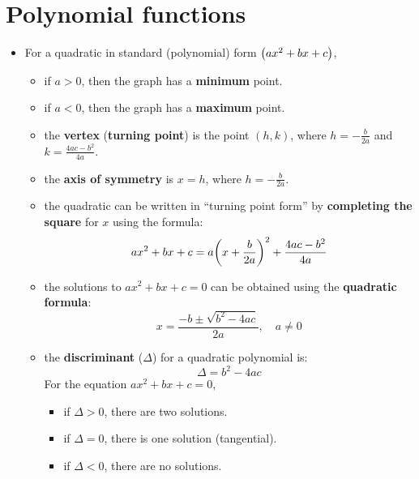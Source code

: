 \documentclass[12pt,a4paper,titlepage]{article}
\DeclarePairedDelimiter {\pars}  {  (      }     {  )      }
\begin{document}
            \pagebreak
            
        \section{Polynomial functions}
            
            \begin{SummaryBox}[title=Quadratics]
                \begin{itemize}[leftmargin=*]
                    \item For a quadratic in standard (polynomial) form $\pars*{ax^2 + bx + c}$,
                    \begin{itemize}[topsep=0pt]
                        \item if $a>0$, then the graph has a \textbf{minimum} point.
                        \item if $a<0$, then the graph has a \textbf{maximum} point.
                        \item the \textbf{vertex} (\textbf{turning point}) is the point $(h,k)$, where $h=-\frac{b}{2a}$ and $k=\frac{4ac-b^2}{4a}$.
                        \item the \textbf{axis of symmetry} is $x=h$, where $h=-\frac{b}{2a}$.
                        \item the quadratic can be written in ``turning point form'' by \textbf{completing the square} for $x$ using the formula:
                        \[
                            ax^2 + bx + c = a\pars*{x+\frac{b}{2a}}^2 + \frac{4ac-b^2}{4a}
                        \]
                        \item the solutions to $ax^2 + bx + c = 0$ can be obtained using the \textbf{quadratic formula}:
                        \[
                            x = \frac{-b \pm \sqrt{b^2 - 4ac}}{2a}, \quad a \neq 0
                        \]
                        \item the \textbf{discriminant} ($\Delta$) for a quadratic polynomial is:
                        \[
                            \Delta = b^2 - 4ac
                        \]
                        For the equation $ax^2 + bx + c = 0$,
                        \begin{itemize}[topsep=0pt]
                            \item if $\Delta > 0$, there are two solutions.
                            \item if $\Delta = 0$, there is one solution (tangential).
                            \item if $\Delta < 0$, there are no solutions.

\end{itemize}
\end{itemize}
\end{itemize}
\end{SummaryBox}
\end{document}
